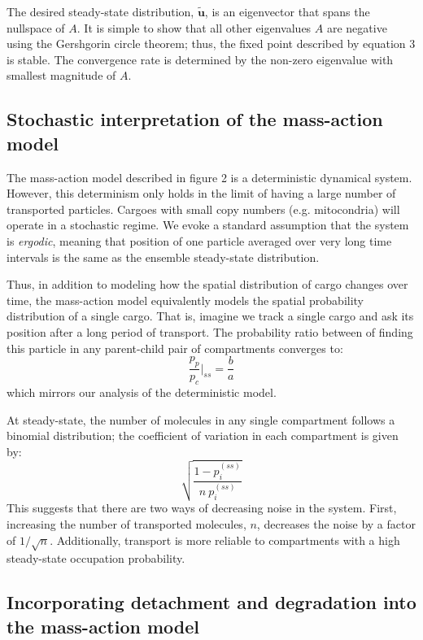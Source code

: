 \documentclass[11pt]{wlpeerj}
\begin{document}
The desired steady-state distribution, $\mathbf{\tilde{u}}$, is an eigenvector that spans the nullspace of $A$. It is simple to show that all other eigenvalues $A$ are negative using the Gershgorin circle theorem; thus, the fixed point described by equation 3 is stable. The convergence rate is determined by the non-zero eigenvalue with smallest magnitude of $A$. 

\subsection*{Stochastic interpretation of the mass-action model}

The mass-action model described in figure 2 is a deterministic dynamical system. However, this determinism only holds in the limit of having a large number of transported particles. Cargoes with small copy numbers (e.g. mitocondria) will operate in a stochastic regime. We evoke a standard assumption that the system is \textit{ergodic}, meaning that position of one particle averaged over very long time intervals is the same as the ensemble steady-state distribution. 

Thus, in addition to modeling how the spatial distribution of cargo changes over time, the mass-action model equivalently models the spatial probability distribution of a single cargo. That is, imagine we track a single cargo and ask its position after a long period of transport. The probability ratio between of finding this particle in any parent-child pair of compartments converges to:
$$
\frac{p_p}{p_c} \bigg|_{ss} = \frac{b}{a}
$$
which mirrors our analysis of the deterministic model.

At steady-state, the number of molecules in any single compartment follows a binomial distribution; the coefficient of variation in each compartment is given by:
$$
\sqrt{\frac{1-p_i^{(ss)}}{n~p_i^{(ss)}}}
$$
This suggests that there are two ways of decreasing noise in the system. First, increasing the number of transported molecules, $n$, decreases the noise by a factor of $1/\sqrt{n}$. Additionally, transport is more reliable to compartments with a high steady-state occupation probability.

\subsection*{Incorporating detachment and degradation into the mass-action model}
\end{document}
